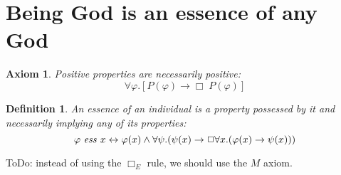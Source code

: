 \documentclass{article}
\newtheorem{axiom}{Axiom}
\newtheorem{definition}{Definition}
\newcommand{\imp}{\rightarrow}
\newcommand{\biimp}{\leftrightarrow}
\newcommand{\all}{\forall}
\newcommand{\nec}{\Box} %
\begin{document}
\section{Being God is an essence of any God}

\begin{axiom}
\label{A4}
Positive properties are necessarily positive:
$$
\all \varphi.[P(\varphi) \to \Box \; P(\varphi)]
$$
\end{axiom}

\begin{definition}
\label{D2}
An \emph{essence} of an individual is a property possessed by it and necessarily implying any of its properties: 
$$
\ess{\varphi}{x} \biimp \varphi(x) \wedge \all \psi. (\psi(x) \imp \nec \all x. (\varphi(x) \imp \psi(x)))
$$
\end{definition}

ToDo: instead of using the $\nec_E$ rule, we should use the $M$ axiom.
\end{document}
